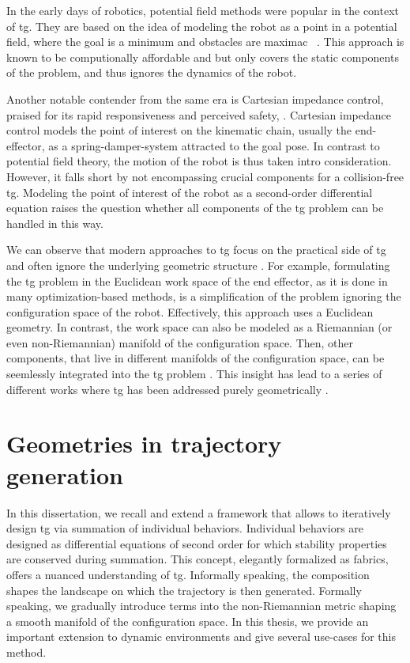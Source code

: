 In the early days of robotics, potential field methods were
popular in the context of \ac{tg}.
They are based on the idea of modeling the robot as
a point in a potential field, where the goal is a minimum
and obstacles are maximac
~\cite{barraquand1992numerical,hwang1992potential}. This
approach is known to be computionally affordable and but
only covers the static components of the problem, and thus
ignores the dynamics of the robot.

Another notable contender from the same era is Cartesian
impedance control, praised for its rapid responsiveness and
perceived safety, \cite{hogan1985impedance}. Cartesian
impedance control models the point of interest on the
kinematic chain, usually the end-effector, as a
spring-damper-system attracted to the goal pose. In contrast
to potential field theory, the motion of the robot is thus
taken intro consideration. However, it falls short by not
encompassing crucial components for a collision-free
\ac{tg}. Modeling the point of interest of the robot as a
second-order differential equation raises the question
whether all components of the \ac{tg} problem can be handled
in this way. 

We can observe that modern approaches to \ac{tg} focus on the
practical side of \ac{tg} and often ignore the underlying
geometric structure \cite{Ratliff2015}. For example,
formulating the \ac{tg} problem in the Euclidean work space
of the end effector, as it is done 
in many optimization-based methods, is a simplification of 
the problem ignoring the configuration space of the robot.
Effectively, this approach uses a Euclidean geometry.
In contrast, the work space can also be modeled as a
Riemannian (or even non-Riemannian) manifold of the
configuration space. Then, other components, that live in 
different manifolds of the configuration space, can be
seemlessly integrated into the \ac{tg} problem \cite{Ratliff2015}.
This insight has lead to a series of different works
where \ac{tg} has been addressed purely geometrically
\cite{Ratliff2015,Cheng2019,Cheng2020,Ratliff2020,Xie2020}.

\section{Geometries in trajectory generation}
\label{sec:geometries_in_trajectory_generation}

In this dissertation, we recall and extend a framework
that allows to iteratively design \ac{tg} via
summation of individual behaviors. Individual behaviors are
designed as differential equations of second order for which
stability properties are conserved during summation.
This concept, elegantly formalized as \ac{fabrics}, offers
a nuanced understanding of \ac{tg}.
Informally speaking, the composition shapes the
landscape on which the trajectory is then generated.
Formally speaking, we gradually introduce terms into the
non-Riemannian metric shaping a smooth manifold of the
configuration space. In this thesis, we provide an important
extension to dynamic environments and give several use-cases
for this method.

